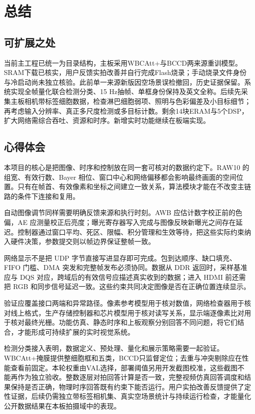 \section{总结}
\subsection{可扩展之处}
当前主工程已统一为目录结构，主板采用WBCAtt+与BCCD两来源重训模型。SRAM下载已核实，用户反馈实拍改善并自行完成Flash烧录；手动烧录文件身份与冷启动尚未独立核验。此前单一来源新版因空场景误检撤回，历史证据保留。系统实现全帧量化联合检测分类、15 Hz抽帧、单框身份保持及英文全称。后续先采集主板相机带标签细胞数据，检查淋巴细胞弱项、照明与色彩偏差及小目标细节；再考虑输入分辨率、真正多尺度检测或多目标计数。剩余14块ERAM与5个DSP，扩大网络需综合吞吐、资源和时序。新增实时功能继续在板端实现。

\subsection{心得体会}
本项目的核心是把图像、时序和控制放在同一套可核对的数据约定下。RAW10 的组宽、有效行数、Bayer 相位、窗口中心和网络偏移都会影响最终画面的空间位置。只有在帧首、有效像素和坐标之间建立一致关系，算法模块才能在不改变主链路的条件下连接和复用。

自动图像调节同样需要明确反馈来源和执行时刻。AWB 应估计数字校正前的色偏，AE 应测量校正后亮度；曝光寄存器写入完成与图像反映新曝光之间存在延迟。控制器通过窗口平均、死区、限幅、积分管理和生效等待，把这些实际约束纳入硬件决策，参数提交则以帧边界保证整帧一致。

网络显示不是把 UDP 字节直接写进显存即可完成。包到达顺序、缺口填充、FIFO 门槛、DMA 突发和完整帧发布必须协同。数据从 DDR 返回时，采样基准应与 DQS 对应，跨域后的有效信号应描述真实收到的数据；进入 HDMI 前还需把 RGB 和同步信号延迟一致。这些约束共同决定图像是否在正确位置连续显示。

验证应覆盖接口两端和异常路径。像素参考模型用于核对数值，网络检查器用于核对线上格式，生产存储控制器和芯片模型用于核对读写关系，显示端逐像素比对用于核对最终光栅。功能仿真、静态时序和上板观察分别回答不同问题，将它们结合，才能形成可持续扩展的实时视觉系统。

检测分类接入表明，数据定义、预处理、量化和展示策略需要一起验证。WBCAtt+掩膜提供整细胞框和五类，BCCD只监督定位；去重与冲突剔除应在性能查看前固定。本轮权重由VAL选择，部署阈值另用开发截图校准，这些截图不能再作为独立验收。整数逐层对拍回答计算是否一致，完整视频仿真回答调度和结果保持是否正确，物理时序回答既有约束下能否运行。用户实拍改善反馈提供了定性证据，后续仍需独立带标签相机集、真实空场景统计与持续运行检查，才能量化公开数据结果在本板拍摄域中的表现。
